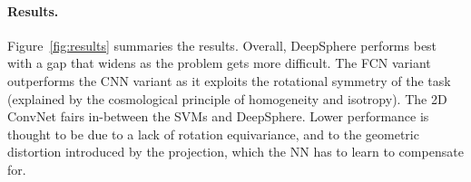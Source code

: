 \documentclass{article} %
\newcommand{\figref}[1]{figure~\ref{fig:#1}}
\newcommand{\Figref}[1]{Figure~\ref{fig:#1}}
\newcommand{\1}{\b{1}}              %
\newcommand{\0}{\b{0}}              %
\begin{document}
\paragraph{Results.}
\Figref{results} summaries the results.
Overall, DeepSphere performs best with a gap that widens as the problem gets more difficult.
The FCN variant outperforms the CNN variant as it exploits the rotational symmetry of the task (explained by the cosmological principle of homogeneity and isotropy).
The 2D ConvNet fairs in-between the SVMs and DeepSphere.
Lower performance is thought to be due to a lack of rotation equivariance, and to the geometric distortion introduced by the projection, which the NN has to learn to compensate for.%
\end{document}
